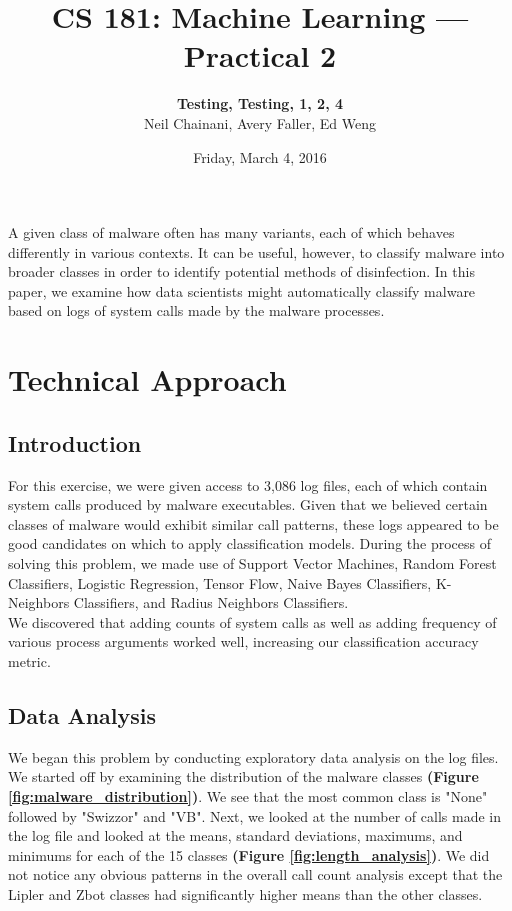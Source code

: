\documentclass[11pt]{article}
\author{{\bf Testing, Testing, 1, 2, 4} \medskip \\ Neil Chainani, Avery Faller, Ed Weng}
\title{CS 181: Machine Learning --- Practical 2}
\date{Friday, March 4, 2016}
\begin{document}
\maketitle

\noindent A given class of malware often has many variants, each of which behaves differently in various contexts. It can be useful, however, to classify malware into broader classes in order to identify potential methods of disinfection. In this paper, we examine how data scientists might automatically classify malware based on logs of system calls made by the malware processes.

\section{Technical Approach}

\subsection{Introduction}
For this exercise, we were given access to 3,086 log files, each of which contain system calls produced by malware executables. Given that we believed certain classes of malware would exhibit similar call patterns, these logs appeared to be good candidates on which to apply classification models. During the process of solving this problem, we made use of Support Vector Machines, Random Forest Classifiers, Logistic Regression, Tensor Flow, Naive Bayes Classifiers, K-Neighbors Classifiers, and Radius Neighbors Classifiers.\\

We discovered that adding counts of system calls as well as adding frequency of various process arguments worked well, increasing our classification accuracy metric.

\subsection{Data Analysis}
We began this problem by conducting exploratory data analysis on the log files. We started off by examining the distribution of the malware classes \textbf{(Figure \ref{fig:malware_distribution})}. We see that the most common class is "None" followed by "Swizzor" and "VB". Next, we looked at the number of calls made in the log file and looked at the means, standard deviations, maximums, and minimums for each of the 15 classes \textbf{(Figure \ref{fig:length_analysis})}. We did not notice any obvious patterns in the overall call count analysis except that the Lipler and Zbot classes had significantly higher means than the other classes.\\
\end{document}
